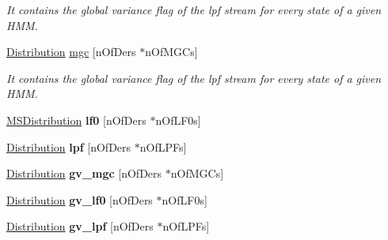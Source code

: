 \begin{DoxyCompactItemize}
\begin{DoxyCompactList}\small\item\em It contains the global variance flag of the lpf stream for every state of a given H\-M\-M. \end{DoxyCompactList}\item 
\hypertarget{struct_m_a_g_e_1_1_state_a1a8511f007e662b79fc204e4cb3261a4}{\hyperlink{struct_m_a_g_e_1_1_distribution}{Distribution} \hyperlink{struct_m_a_g_e_1_1_state_a1a8511f007e662b79fc204e4cb3261a4}{mgc} \mbox{[}n\-Of\-Ders $\ast$n\-Of\-M\-G\-Cs\mbox{]}}\label{struct_m_a_g_e_1_1_state_a1a8511f007e662b79fc204e4cb3261a4}

\begin{DoxyCompactList}\small\item\em It contains the global variance flag of the lpf stream for every state of a given H\-M\-M. \end{DoxyCompactList}\item 
\hypertarget{struct_m_a_g_e_1_1_state_ae1685135e0a59bc23e8e7bbde11c2c97}{\hyperlink{struct_m_a_g_e_1_1_m_s_distribution}{M\-S\-Distribution} {\bfseries lf0} \mbox{[}n\-Of\-Ders $\ast$n\-Of\-L\-F0s\mbox{]}}\label{struct_m_a_g_e_1_1_state_ae1685135e0a59bc23e8e7bbde11c2c97}

\item 
\hypertarget{struct_m_a_g_e_1_1_state_a62f825871ec404acd4387f66c3a9d2d9}{\hyperlink{struct_m_a_g_e_1_1_distribution}{Distribution} {\bfseries lpf} \mbox{[}n\-Of\-Ders $\ast$n\-Of\-L\-P\-Fs\mbox{]}}\label{struct_m_a_g_e_1_1_state_a62f825871ec404acd4387f66c3a9d2d9}

\item 
\hypertarget{struct_m_a_g_e_1_1_state_ae7506fd46c784319649c618c4a71dd5f}{\hyperlink{struct_m_a_g_e_1_1_distribution}{Distribution} {\bfseries gv\-\_\-mgc} \mbox{[}n\-Of\-Ders $\ast$n\-Of\-M\-G\-Cs\mbox{]}}\label{struct_m_a_g_e_1_1_state_ae7506fd46c784319649c618c4a71dd5f}

\item 
\hypertarget{struct_m_a_g_e_1_1_state_ac6a49470b063d92f069d3974bbe9fb81}{\hyperlink{struct_m_a_g_e_1_1_distribution}{Distribution} {\bfseries gv\-\_\-lf0} \mbox{[}n\-Of\-Ders $\ast$n\-Of\-L\-F0s\mbox{]}}\label{struct_m_a_g_e_1_1_state_ac6a49470b063d92f069d3974bbe9fb81}

\item 
\hypertarget{struct_m_a_g_e_1_1_state_a7bccb3672ce2572036faf33f280278fc}{\hyperlink{struct_m_a_g_e_1_1_distribution}{Distribution} {\bfseries gv\-\_\-lpf} \mbox{[}n\-Of\-Ders $\ast$n\-Of\-L\-P\-Fs\mbox{]}}\label{struct_m_a_g_e_1_1_state_a7bccb3672ce2572036faf33f280278fc}

\end{DoxyCompactItemize}


